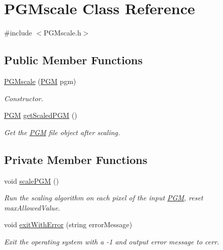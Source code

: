\hypertarget{class_p_g_mscale}{}\section{P\+G\+Mscale Class Reference}
\label{class_p_g_mscale}


{\ttfamily \#include $<$P\+G\+Mscale.\+h$>$}

\subsection*{Public Member Functions}
\begin{DoxyCompactItemize}
\item 
\hyperlink{class_p_g_mscale_a28eaa47d6980e0613fc03e165ff5f4e2}{P\+G\+Mscale} (\hyperlink{class_p_g_m}{P\+G\+M} pgm)
\begin{DoxyCompactList}\small\item\em Constructor. \end{DoxyCompactList}\item 
\hyperlink{class_p_g_m}{P\+G\+M} \hyperlink{class_p_g_mscale_a2ac1e39294f199811ee2d1e9632dcf43}{get\+Scaled\+P\+G\+M} ()
\begin{DoxyCompactList}\small\item\em Get the \hyperlink{class_p_g_m}{P\+G\+M} file object after scaling. \end{DoxyCompactList}\end{DoxyCompactItemize}
\subsection*{Private Member Functions}
\begin{DoxyCompactItemize}
\item 
void \hyperlink{class_p_g_mscale_a3fc9fcc40bb3ed9b52f5bdb3ffbb38af}{scale\+P\+G\+M} ()
\begin{DoxyCompactList}\small\item\em Run the scaling algorithm on each pixel of the input \hyperlink{class_p_g_m}{P\+G\+M}, reset max\+Allowed\+Value. \end{DoxyCompactList}\item 
void \hyperlink{class_p_g_mscale_a294c16ff872a441d832d090176a268f6}{exit\+With\+Error} (string error\+Message)
\begin{DoxyCompactList}\small\item\em Exit the operating system with a -\/1 and output error message to cerr. \end{DoxyCompactList}\end{DoxyCompactItemize}
